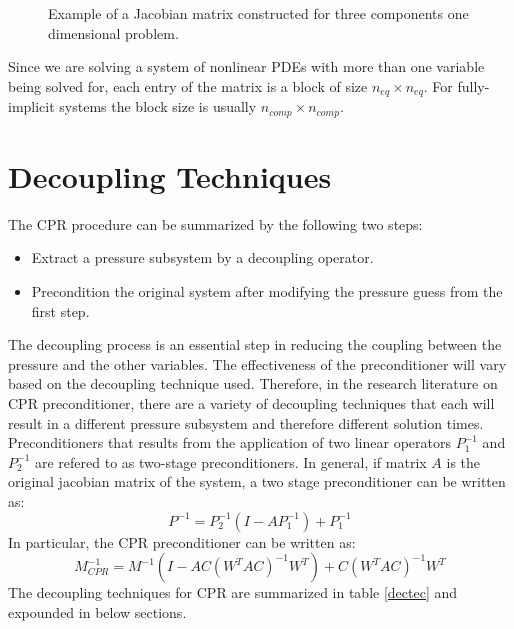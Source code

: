 \begin{figure}[H]
\resizebox{9.5cm}{!}{}
\caption{Example of a Jacobian matrix constructed for three components one dimensional problem.}
\label{jacobian}
\end{figure}
Since we are solving a system of nonlinear PDEs with more than one variable being solved for, each entry of the matrix is a block of size
$n_{eq}\times n_{eq}$. For fully-implicit systems the block size is usually $n_{comp}\times n_{comp}$.

\section{Decoupling Techniques}
The CPR procedure can be summarized by the following two steps:
\begin{itemize}
	\item Extract a pressure subsystem by a decoupling operator.
	\item Precondition the original system after modifying the pressure guess from the first step.
\end{itemize}
The decoupling process is an essential step in reducing the coupling between the pressure and the other variables.
The effectiveness of the preconditioner will vary based on the decoupling technique used. Therefore, in the research
literature on CPR preconditioner, there are a variety of decoupling techniques that each will result in a different pressure
subsystem and therefore different solution times. Preconditioners that results from the application of two linear operators
$P_{1}^{-1}$ and $P_{2}^{-1}$ are refered to as two-stage preconditioners. In general, if matrix $A$ is the original jacobian
matrix of the system, a two stage preconditioner can be written as:
\begin{equation}
	P^{-1} = P_{2}^{-1}(I-AP_{1}^{-1}) + P_{1}^{-1}
\end{equation}
In particular, the CPR preconditioner can be written as:
\begin{equation}
	M_{CPR}^{-1} = M^{-1}(I - AC(W^{T}AC)^{-1}W^{T}) + C(W^{T}AC)^{-1}W^{T}
\end{equation}
The decoupling techniques for CPR are summarized in table \ref{dectec} and expounded in below sections.

